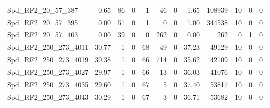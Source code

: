 \begin{longtable}[c]{@{}lrrrrrrrrrrr@{}}
Spd\_RF2\_20\_57\_387        & -0.65                  & 86                      & 0                       & 1                      & 46                      & 0                       & 1.65                    & 108939                   & 10                       & 0                        & 0                        \\
Spd\_RF2\_20\_57\_395        & 0.00                   & 51                      & 0                       & 1                      & 0                       & 0                       & 1.00                    & 344538                   & 10                       & 0                        & 0                        \\
Spd\_RF2\_20\_57\_403        & 0.00                   & 39                      & 0                       & 0                      & 262                     & 0                       & 0.00                    & 262                      & 0                        & 1                        & 0                        \\
Spd\_RF2\_250\_273\_4011     & 30.77                  & 1                       & 0                       & 68                     & 49                      & 0                       & 37.23                   & 49129                    & 10                       & 0                        & 0                        \\
Spd\_RF2\_250\_273\_4019     & 30.38                  & 1                       & 0                       & 66                     & 714                     & 0                       & 35.62                   & 42109                    & 10                       & 0                        & 0                        \\
Spd\_RF2\_250\_273\_4027     & 29.97                  & 1                       & 0                       & 66                     & 13                      & 0                       & 36.03                   & 41076                    & 10                       & 0                        & 0                        \\
Spd\_RF2\_250\_273\_4035     & 29.60                  & 1                       & 0                       & 67                     & 5                       & 0                       & 37.40                   & 53817                    & 10                       & 0                        & 0                        \\
Spd\_RF2\_250\_273\_4043     & 30.29                  & 1                       & 0                       & 67                     & 3                       & 0                       & 36.71                   & 53682                    & 10                       & 0                        & 0                        \\

\end{longtable}
